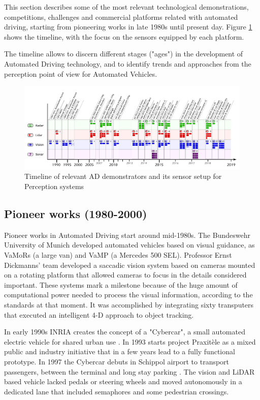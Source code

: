 This section describes some of the most relevant technological demonstrations, competitions, challenges and commercial platforms related with automated driving, starting from pioneering works in late 1980s until present day. Figure \ref{fig:tech-demos} shows the timeline, with the focus on the sensors equipped by each platform.

The timeline allows to discern different stages ("ages") in the development of Automated Driving technology, and to identify trends and approaches from the perception point of view for Automated Vehicles.

\begin{figure}[p] %
  \centering
  \includegraphics[width=0.95\textheight,angle=90,keepaspectratio]{"img/AD_Timeline_2"}
  \caption{Timeline of relevant AD demonstrators and its sensor setup for 
      Perception systems}
  \label{fig:tech-demos}
\end{figure}

\subsection{Pioneer works (1980-2000)}

Pioneer works in Automated Driving start around mid-1980s. The Bundeswehr 
University of Munich developed automated vehicles based on visual guidance, as 
VaMoRs \cite{Dickmanns1987} (a large van) and VaMP \cite{Gregor2002} (a 
Mercedes 500 SEL). Professor Ernst Dickmanns' team developed a saccadic vision 
system based on cameras mounted on a rotating platform that allowed cameras to 
focus in the details considered important.
These systems mark a milestone because of the huge amount of computational 
power needed to process the visual information, according to the standards at 
that moment. It was accomplished by integrating sixty transputers that executed 
an intelligent 4-D approach to object tracking.

In early 1990s INRIA creates the concept of a "Cybercar", a small automated 
electric vehicle for shared urban use \cite{Parent1993}. In 1993 starts project 
Praxitèle \cite{Massot1999} as a mixed public and industry initiative that in a 
few years lead to a fully functional prototype. 
In 1997 the Cybercar debuts in Schippol airport to transport passengers, between the terminal and long stay parking \cite{Ozguner2007}. The vision and LiDAR based vehicle lacked pedals or steering wheels and moved autonomously in a dedicated lane that included semaphores and some pedestrian crossings.

